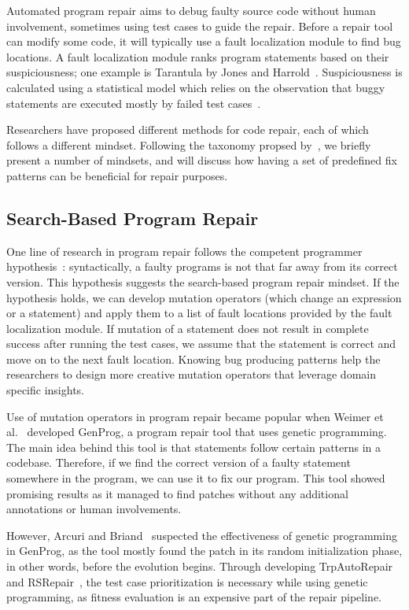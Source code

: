 Automated program repair aims to debug faulty source code without human involvement, sometimes using test cases to guide the repair. Before a repair tool can modify some code, it will typically use a fault localization module to find bug locations. A fault localization module ranks program statements based on their suspiciousness; one example is Tarantula by Jones and Harrold~\cite{jones2005empirical}. Suspiciousness is calculated using a statistical model which relies on the observation that buggy statements are executed mostly by failed test cases~\cite{naish2009spectral,xie2013theoretical}.

Researchers have proposed different methods for code repair, each of which follows a different mindset. Following the taxonomy propsed by~\cite{liu2018survey}, we briefly present a number of mindsets, and will discuss how having a set of predefined fix patterns can be beneficial for repair purposes.

\subsection{Search-Based Program Repair}
One line of research in program repair follows the competent programmer hypothesis~\cite{gopinath2014mutant}: syntactically, a faulty programs is not that far away from its correct version. This hypothesis suggests the search-based program repair mindset. If the hypothesis holds, we can develop mutation operators (which change an expression or a statement) and apply them to a list of fault locations provided by the fault localization module. If mutation of a statement does not result in complete success after running the test cases, we assume that the statement is correct and move on to the next fault location. Knowing bug producing patterns help the researchers to design more creative mutation operators that leverage domain specific insights.

Use of mutation operators in program repair became popular when Weimer et al.~\cite{forrest2009genetic,nguyen2009using} developed GenProg, a program repair tool that uses genetic programming. The main idea behind this tool is that statements follow certain patterns in a codebase. Therefore, if we find the correct version of a faulty statement somewhere in the program, we can use it to fix our program. This tool showed promising results as it managed to find patches without any additional annotations or human involvements.

However, Arcuri and Briand~\cite{arcuri2011practical} suspected the effectiveness of genetic programming in GenProg, as the tool mostly found the patch in its random initialization phase, in other words, before the evolution begins. Through developing TrpAutoRepair~\cite{qi2013efficient} and RSRepair~\cite{qi2014strength}, the test case prioritization is necessary while using genetic programming, as fitness evaluation is an expensive part of the repair pipeline.

